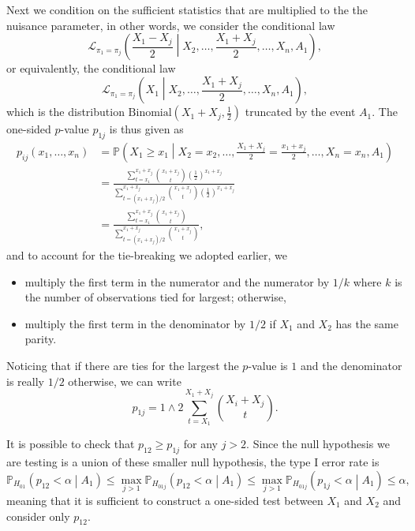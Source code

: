 \documentclass[11pt]{article}
\newcommand{\PP}{\mathbb{P}}
\begin{document}
Next we condition on the sufficient statistics that are multiplied to the the nuisance parameter, in other words, we consider the conditional law
$$\mathcal{L}_{\pi_1 = \pi_j}\left(\frac{X_1 - X_j}{2} \middle| X_2, \ldots, \frac{X_1 + X_j}{2}, \ldots, X_n, A_1\right),$$
or equivalently, the conditional law
$$\mathcal{L}_{\pi_1 = \pi_j}\left(X_1 \middle| X_2, \ldots, \frac{X_1 + X_j}{2}, \ldots, X_n, A_1\right),$$
which is the distribution $\text{Binomial}\left(X_1 + X_j, \frac{1}{2}\right)$ truncated by the event $A_1$. The one-sided $p$-value $p_{1j}$ is thus given as
\begin{align*}
p_{ij}\left(x_1, \ldots, x_n\right) & = \PP\left(X_1 \ge x_1 \middle| X_2 = x_2, \ldots, \frac{X_1 + X_j}{2} = \frac{x_1 + x_j}{2}, \ldots, X_n = x_n, A_1\right) \\
& = \frac{\sum_{t = x_1}^{x_1 + x_j} \binom{x_1 + x_j}{t} \left(\frac{1}{2}\right)^{x_1 + x_j}}{\sum_{t = \left(x_1 + x_j\right)/2}^{x_1 + x_j} \binom{x_1 + x_j}{t} \left(\frac{1}{2}\right)^{x_1 + x_j}} \\
& = \frac{\sum_{t = x_1}^{x_1 + x_j} \binom{x_1 + x_j}{t}}{\sum_{t = \left(x_1 + x_j\right)/2}^{x_1 + x_j} \binom{x_1 + x_j}{t}},
\end{align*}
and to account for the tie-breaking we adopted earlier, we
\begin{itemize}
\item multiply the first term in the numerator and the numerator by $1/k$ where $k$ is the number of observations tied for largest; otherwise,
\item multiply the first term in the denominator by $1/2$ if $X_1$ and $X_2$ has the same parity.
\end{itemize}
Noticing that if there are ties for the largest the $p$-value is $1$ and the denominator is really $1/2$ otherwise, we can write
$$p_{1j} = 1 \wedge 2 \sum_{t=X_1}^{X_1 + X_j} \binom{X_i + X_j}{t}.$$

It is possible to check that $p_{12} \ge p_{1j}$ for any $j > 2$. Since the null hypothesis we are testing is a union of these smaller null hypothesis, the type I error rate is
$$\PP_{H_{01}}\left(p_{12} < \alpha \middle| A_1\right) \le \max_{j>1} \PP_{H_{01j}}\left(p_{12} < \alpha \middle| A_1\right) \le \max_{j>1} \PP_{H_{01j}}\left(p_{1j} < \alpha \middle| A_1\right) \le \alpha,$$
meaning that it is sufficient to construct a one-sided test between $X_1$ and $X_2$ and consider only $p_{12}$.
\end{document}
